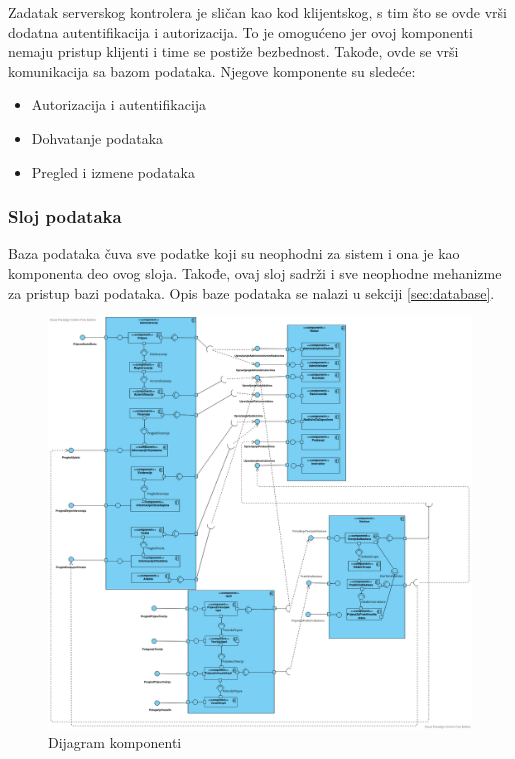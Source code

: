 Zadatak serverskog kontrolera je sličan kao kod klijentskog, s tim što se ovde vrši dodatna autentifikacija 
i autorizacija. To je omogućeno jer ovoj komponenti nemaju pristup klijenti i time se postiže bezbednost.
Takođe, ovde se vrši komunikacija sa bazom podataka.
Njegove komponente su sledeće:

\begin{itemize}
    \item Autorizacija i autentifikacija
    \item Dohvatanje podataka
    \item Pregled i izmene podataka 
\end{itemize}

\subsubsection {Sloj podataka}

Baza podataka čuva sve podatke koji su neophodni za sistem i ona je kao komponenta deo ovog sloja.
Takođe, ovaj sloj sadrži i sve neophodne mehanizme za pristup bazi podataka.
Opis baze podataka se nalazi u sekciji \ref{sec:database}.


\begin{figure}[H]
  \begin{center}
      \includegraphics[width=\textwidth]{Diagrams/dijagram_komponenti.png}
  \end{center}
  \caption {Dijagram komponenti}
  \label{activity_dijagram_komponenti}

\end{figure}
